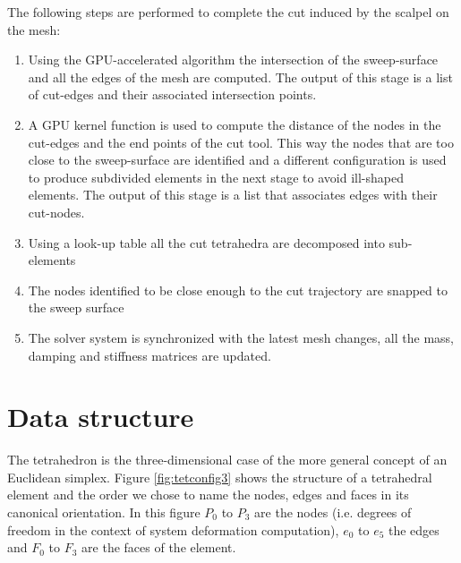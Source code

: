 The following steps are performed to complete the cut induced by the scalpel on the mesh:

\begin{enumerate}
 \item Using the GPU-accelerated algorithm the intersection of the sweep-surface and all the edges of the mesh 
 are computed. The output of this stage is a list of cut-edges and their associated intersection points. 
 
 \item A GPU kernel function is used to compute the distance of the nodes in the cut-edges and the end points of 
 the cut tool. This way the nodes that are too close to the sweep-surface are identified and a different configuration 
 is used to produce subdivided elements in the next stage to avoid ill-shaped elements. The output of this stage is 
 a list that associates edges with their cut-nodes.
 
 \item Using a look-up table all the cut tetrahedra are decomposed into sub-elements
 
 \item The nodes identified to be close enough to the cut trajectory are snapped to the sweep surface
 
 \item The solver system is synchronized with the latest mesh changes, all the mass, damping and stiffness 
 matrices are updated.
\end{enumerate}


\section{Data structure}
The tetrahedron is the three-dimensional case of the more general concept of an Euclidean simplex. 
Figure \ref{fig:tetconfig3} shows the structure of a tetrahedral element and the order we chose to 
name the nodes, edges and faces in its canonical orientation. In this figure $P_0$ to $P_3$ are
the nodes (i.e. degrees of freedom in the context of system deformation computation), $e_0$ to $e_5$ the edges 
and $F_0$ to $F_3$ are the faces of the element.

